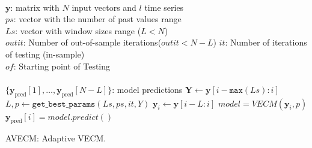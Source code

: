 \begin{algorithm}[ht]
\begin{algorithmic}[1]
\REQUIRE $\,$ \\
$\mathbf{y}$: matrix with $N$ input vectors and $l$ time series\\
$ps$: vector with the number of past values range \\
$Ls$: vector with window sizes range ($L<N$) \\
$outit$: Number of out-of-sample iterations($outit < N-L$)
$it$: Number of iterations of testing (in-sample)\\
$of$: Starting point of Testing \\
\ENSURE  $\,$ \\
$\{ \mathbf{y}_{\text{pred}}[1],\dots,\mathbf{y}_{\text{pred}}[N-L]\}$: model predictions 
   \STATE $\mathbf{Y} \gets \mathbf{y}[i-\texttt{max}(Ls):i]$
    \STATE $L,p \gets
    \texttt{get\_best\_params}(Ls,ps,it,Y)$
    \STATE $\mathbf{y}_i \gets \mathbf{y}[i-L:i]$
        \STATE $model = VECM(\mathbf{y}_i, p)$
        \STATE $\mathbf{y}_{\text{pred}}[i] = model.predict()$
\ENDFOR
\end{algorithmic}
\caption{AVECM: Adaptive VECM.}
\label{alg:AVECM}
\end{algorithm}

%
%
%
%
%
%

